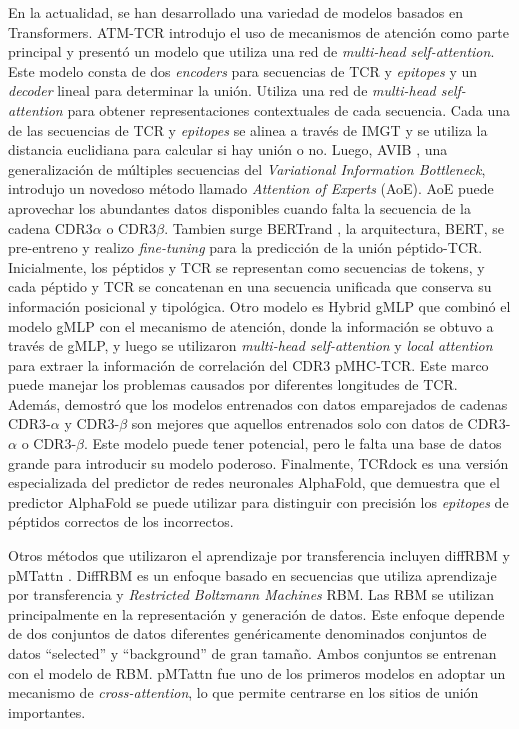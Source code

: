 En la actualidad, se han desarrollado una variedad de modelos basados en Transformers. ATM-TCR \citep{cai2022atm} introdujo el uso de mecanismos de atención como parte principal y presentó un modelo que utiliza una red de \textit{multi-head self-attention}. Este modelo consta de dos \textit{encoders} para secuencias de TCR y \textit{epitopes} y un \textit{decoder} lineal para determinar la unión. Utiliza una red de \textit{multi-head self-attention} para obtener representaciones contextuales de cada secuencia. Cada una de las secuencias de TCR y \textit{epitopes} se alinea a través de IMGT y se utiliza la distancia euclidiana para calcular si hay unión o no. Luego, AVIB \citep{10.1093/bioinformatics/btac820}, una generalización de múltiples secuencias del \textit{Variational Information Bottleneck}, introdujo un novedoso método llamado \textit{Attention of Experts} (AoE). AoE puede aprovechar los abundantes datos disponibles cuando falta la secuencia de la cadena CDR3$\alpha$ o CDR3$\beta$. Tambien surge BERTrand \citep{myronov2023bertrand}, la arquitectura, BERT, se pre-entreno y realizo \textit{fine-tuning} para la predicción de la unión péptido-TCR. Inicialmente, los péptidos y TCR se representan como secuencias de tokens, y cada péptido y TCR se concatenan en una secuencia unificada que conserva su información posicional y tipológica. Otro modelo es Hybrid gMLP \citep{zhang2023hybrid} que combinó el modelo gMLP con el mecanismo de atención, donde la información se obtuvo a través de gMLP, y luego se utilizaron \textit{multi-head self-attention} y \textit{local attention} para extraer la información de correlación del CDR3 pMHC-TCR. Este marco puede manejar los problemas causados por diferentes longitudes de TCR. Además, demostró que los modelos entrenados con datos emparejados de cadenas CDR3-$\alpha$ y CDR3-$\beta$ son mejores que aquellos entrenados solo con datos de CDR3-$\alpha$ o CDR3-$\beta$. Este modelo puede tener potencial, pero le falta una base de datos grande para introducir su modelo poderoso. Finalmente, TCRdock \citep{bradley2023structure} es una versión especializada del predictor de redes neuronales AlphaFold, que demuestra que el predictor AlphaFold se puede utilizar para distinguir con precisión los \textit{epitopes} de péptidos correctos de los incorrectos. 

Otros métodos que utilizaron el aprendizaje por transferencia incluyen diffRBM \citep{bravi2023transfer} y pMTattn \citep{9994875}. DiffRBM es un enfoque basado en secuencias que utiliza aprendizaje por transferencia y \textit{Restricted Boltzmann Machines} RBM. Las RBM se utilizan principalmente en la representación y generación de datos. Este enfoque depende de dos conjuntos de datos diferentes genéricamente denominados conjuntos de datos ``selected'' y ``background'' de gran tamaño. Ambos conjuntos se entrenan con el modelo de RBM. pMTattn fue uno de los primeros modelos en adoptar un mecanismo de \textit{cross-attention}, lo que permite centrarse en los sitios de unión importantes. 


